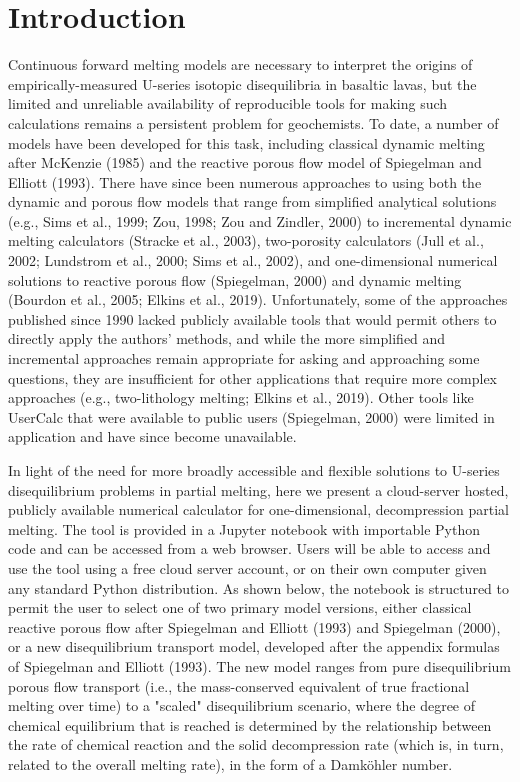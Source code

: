 \documentclass[draft]{agujournal2019}
\begin{document}
\section{Introduction}

Continuous forward melting models are necessary to interpret the origins of empirically-measured U-series isotopic disequilibria in basaltic lavas, but the limited and unreliable availability of reproducible tools for making such calculations remains a persistent problem for geochemists. To date, a number of models have been developed for this task, including classical dynamic melting after McKenzie (1985) and the reactive porous flow model of Spiegelman and Elliott (1993). There have since been numerous approaches to using both the dynamic and porous flow models that range from simplified analytical solutions (e.g., Sims et al., 1999; Zou, 1998; Zou and Zindler, 2000) to incremental dynamic melting calculators (Stracke et al., 2003), two-porosity calculators (Jull et al., 2002; Lundstrom et al., 2000; Sims et al., 2002), and one-dimensional numerical solutions to reactive porous flow (Spiegelman, 2000) and dynamic melting (Bourdon et al., 2005; Elkins et al., 2019). Unfortunately, some of the approaches published since 1990 lacked publicly available tools that would permit others to directly apply the authors' methods, and while the more simplified and incremental approaches remain appropriate for asking and approaching some questions, they are insufficient for other applications that require more complex approaches (e.g., two-lithology melting; Elkins et al., 2019). Other tools like UserCalc that were available to public users (Spiegelman, 2000) were limited in application and have since become unavailable.

In light of the need for more broadly accessible and flexible solutions to U-series disequilibrium problems in partial melting, here we present a cloud-server hosted, publicly available numerical calculator for one-dimensional, decompression partial melting. The tool is provided in a Jupyter notebook with importable Python code and can be accessed from a web browser. Users will be able to access and use the tool using a free cloud server account, or on their own computer given any standard Python distribution. As shown below, the notebook is structured to permit the user to select one of two primary model versions, either classical reactive porous flow after Spiegelman and Elliott (1993) and Spiegelman (2000), or a new disequilibrium transport model, developed after the appendix formulas of Spiegelman and Elliott (1993). The new model ranges from pure disequilibrium porous flow transport (i.e., the mass-conserved equivalent of true fractional melting over time) to a "scaled" disequilibrium scenario, where the degree of chemical equilibrium that is reached is determined by the relationship between the rate of chemical reaction and the solid decompression rate (which is, in turn, related to the overall melting rate), in the form of a Damk\"{o}hler number.
\end{document}
